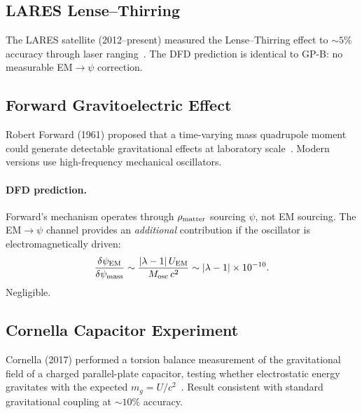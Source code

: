 \documentclass[aps,prd,twocolumn,superscriptaddress,floatfix,nofootinbib]{revtex4-2}
\newcommand{\lam}{\lambda}
\begin{document}
\subsection{LARES Lense--Thirring}\label{sec:lares}

The LARES satellite (2012--present) measured the Lense--Thirring effect
to $\sim 5\%$ accuracy through laser ranging~\cite{Ciufolini2019}.
The DFD prediction is identical to GP-B: no measurable EM$\to\psi$
correction.

\subsection{Forward Gravitoelectric Effect}\label{sec:forward}

Robert Forward (1961) proposed that a time-varying mass quadrupole
moment could generate detectable gravitational effects at laboratory
scale~\cite{Forward1961}. Modern versions use high-frequency mechanical
oscillators.

\paragraph{DFD prediction.}
Forward's mechanism operates through $\rho_{\rm matter}$ sourcing
$\psi$, not EM sourcing. The EM$\to\psi$ channel provides an
\emph{additional} contribution if the oscillator is electromagnetically
driven:
\begin{equation}
\frac{\delta\psi_{\rm EM}}{\delta\psi_{\rm mass}} \sim
\frac{|\lam-1|\,U_{\rm EM}}{M_{\rm osc}\,c^2}
\sim |\lam-1| \times 10^{-10}.
\end{equation}
Negligible.

\subsection{Cornella Capacitor Experiment}\label{sec:cornella}

Cornella (2017) performed a torsion balance measurement of the
gravitational field of a charged parallel-plate capacitor, testing
whether electrostatic energy gravitates with the expected
$m_g = U/c^2$~\cite{Cornella2017}. Result consistent with standard
gravitational coupling at $\sim 10\%$ accuracy.
\end{document}

